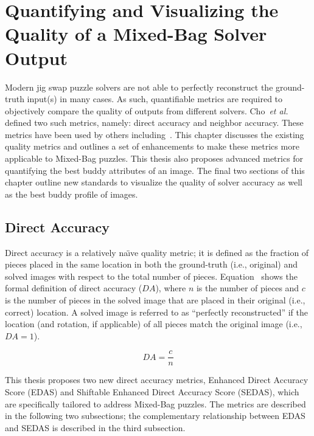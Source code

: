 \chapter{Quantifying and Visualizing the Quality of a Mixed-Bag Solver Output}\label{chap:quantifyingSolverQuantify}

Modern jig swap puzzle solvers are not able to perfectly reconstruct the ground-truth input(s) in many cases.  As such, quantifiable metrics are required to objectively compare the quality of outputs from different solvers.  Cho~\textit{et al.}~\cite{cho2010} defined two such metrics, namely: direct accuracy and neighbor accuracy. These metrics have been used by others including~\cite{sholomon2013, pomeranz2011, paikin2015, son2014, gallagher2012}.  This chapter discusses the existing quality metrics and outlines a set of enhancements to make these metrics more applicable to Mixed-Bag puzzles.  This thesis also proposes advanced metrics for quantifying the best buddy attributes of an image.  The final two sections of this chapter outline new standards to visualize the quality of solver accuracy as well as the best buddy profile of images.

\section{Direct Accuracy}\label{sec:directAccuracy}

Direct accuracy is a relatively na\"{\i}ve quality metric; it is defined as the fraction of pieces placed in the same location in both the ground-truth (i.e., original) and solved images with respect to the total number of pieces. Equation~ shows the formal definition of direct accuracy ($DA$), where $n$ is the number of pieces and $c$ is the number of pieces in the solved image that are placed in their original (i.e., correct) location.  A solved image is referred to as ``perfectly reconstructed'' if the location (and rotation, if applicable) of all pieces match the original image (i.e.,~$DA=1$).

\begin{equation} \label{eq:directAccuracy}
  DA = \frac{c}{n}
\end{equation}

This thesis proposes two new direct accuracy metrics, Enhanced Direct Accuracy Score (EDAS) and Shiftable Enhanced Direct Accuracy Score (SEDAS), which are specifically tailored to address Mixed-Bag puzzles.  The metrics are described in the following two subsections; the complementary relationship between EDAS and SEDAS is described in the third subsection.

